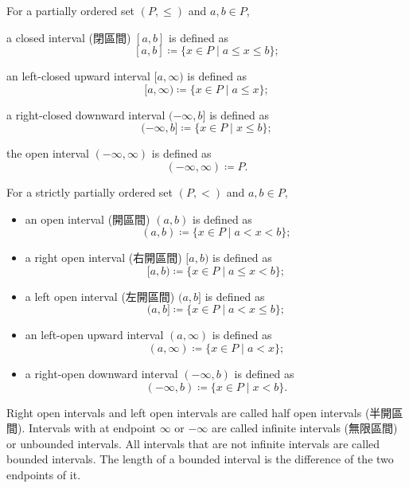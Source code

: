 \documentclass[a4paper,12pt]{article}
\begin{document}
For a partially ordered set $(P,\leq)$ and $a,b\in P$, 
\bit
\item a closed interval (閉區間) $[a,b]$ is defined as
\[[a,b]\coloneq\{x\in P\mid a\leq x\leq b\};\]
\item an left-closed upward interval $[a,\infty)$ is defined as
\[[a,\infty)\coloneq\{x\in P\mid a\leq x\};\]
\item a right-closed downward interval $(-\infty,b]$ is defined as
\[(-\infty,b]\coloneq\{x\in P\mid x\leq b\};\]
\item the open interval $(-\infty,\infty)$ is defined as
\[(-\infty,\infty)\coloneq P.\]
\eit

For a strictly partially ordered set $(P,<)$ and $a,b\in P$,
\begin{itemize}
\item an open interval (開區間) $(a,b)$ is defined as
\[(a,b)\coloneq\{x\in P\mid a<x<b\};\]
\item a right open interval (右開區間) $[a,b)$ is defined as
\[[a,b)\coloneq\{x\in P\mid a\leq x<b\};\]
\item a left open interval (左開區間) $(a,b]$ is defined as
\[(a,b]\coloneq\{x\in P\mid a<x\leq b\};\]
\item an left-open upward interval $(a,\infty)$ is defined as
\[(a,\infty)\coloneq\{x\in P\mid a<x\};\]
\item a right-open downward interval $(-\infty,b)$ is defined as
\[(-\infty,b)\coloneq\{x\in P\mid x<b\}.\]
\end{itemize}

Right open intervals and left open intervals are called half open intervals (半開區間). Intervals with at endpoint $\infty$ or $-\infty$ are called infinite intervals (無限區間) or unbounded intervals. All intervals that are not infinite intervals are called bounded intervals. The length of a bounded interval is the difference of the two endpoints of it.
\end{document}
